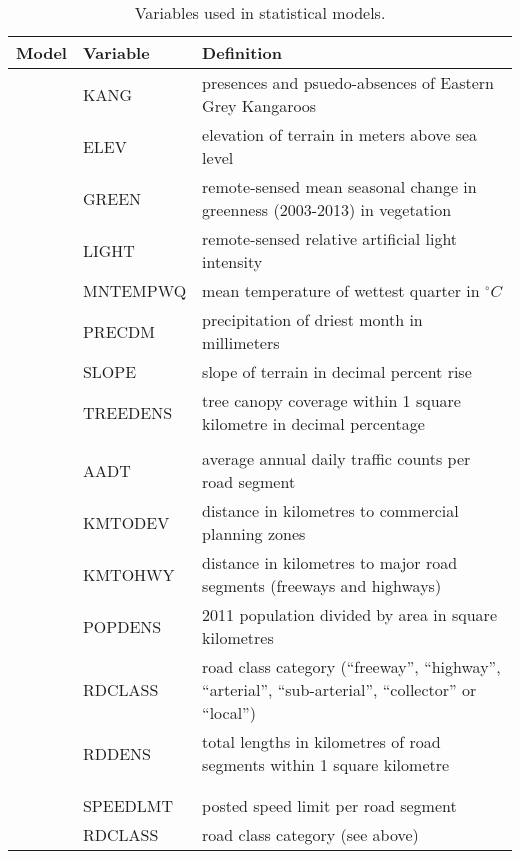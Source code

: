 \begin{table}[htp]
\caption[Variables used in statistical models]{Variables used in statistical models.}
\begin{tabularx}{\textwidth}{llY} \toprule
Model &Variable    &Definition\\ \midrule 
{}   &KANG        &presences and psuedo-absences of Eastern Grey Kangaroos\\
           		 &ELEV        &elevation of terrain in meters above sea level\\
           		 &GREEN       &remote-sensed mean seasonal change in greenness (2003-2013) in vegetation\\
           		 &LIGHT       &remote-sensed relative artificial light intensity\\
           		 &MNTEMPWQ    &mean temperature of wettest quarter in $^{\circ}C$\\
           		 &PRECDM      &precipitation of driest month in millimeters\\
           		 &SLOPE       &slope of terrain in decimal percent rise\\
           		 &TREEDENS    &tree canopy coverage within 1 square kilometre in decimal percentage\\
&&\\
   &AADT        &average annual daily traffic counts per road segment\\
           		 &KMTODEV     &distance in kilometres to commercial planning zones\\
           		 &KMTOHWY     &distance in kilometres to major road segments (freeways and highways)\\
           		 &POPDENS     &2011 population divided by area in square kilometres\\
           		 &RDCLASS     &road class category (``freeway'', ``highway'', ``arterial'', ``sub-arterial'', ``collector'' or ``local'')\\
           		 &RDDENS      &total lengths in kilometres of road segments within 1 square kilometre\\
&&\\
 &&\\
    			 &SPEEDLMT    &posted speed limit per road segment	\\
           		 &RDCLASS     &road class category (see above)\\

\end{tabularx}
\end{table}
